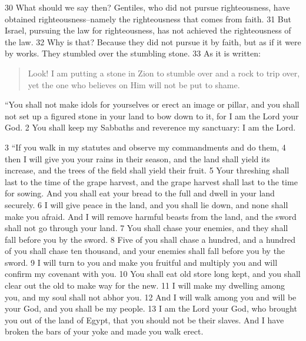 \begin{bible}

30 What should we say then? Gentiles, who did not pursue righteousness, have obtained righteousness--namely the righteousness that comes from faith. 31 But Israel, pursuing the law for righteousness, has not achieved the righteousness of the law. 32 Why is that? Because they did not pursue it by faith, but as if it were by works. They stumbled over the stumbling stone. 33 As it is written:
\begin{quote}
Look! I am putting a stone in Zion to stumble over
and a rock to trip over,
yet the one who believes on Him will not be put to shame.
\end{quote}


``You shall not make idols for yourselves or erect an image or pillar, and you shall not set up a figured stone in your land to bow down to it, for I am the Lord your God. 2 You shall keep my Sabbaths and reverence my sanctuary: I am the Lord.

3 ``If you walk in my statutes and observe my commandments and do them, 4 then I will give you your rains in their season, and the land shall yield its increase, and the trees of the field shall yield their fruit. 5 Your threshing shall last to the time of the grape harvest, and the grape harvest shall last to the time for sowing. And you shall eat your bread to the full and dwell in your land securely. 6 I will give peace in the land, and you shall lie down, and none shall make you afraid. And I will remove harmful beasts from the land, and the sword shall not go through your land. 7 You shall chase your enemies, and they shall fall before you by the sword. 8 Five of you shall chase a hundred, and a hundred of you shall chase ten thousand, and your enemies shall fall before you by the sword. 9 I will turn to you and make you fruitful and multiply you and will confirm my covenant with you. 10 You shall eat old store long kept, and you shall clear out the old to make way for the new. 11 I will make my dwelling among you, and my soul shall not abhor you. 12 And I will walk among you and will be your God, and you shall be my people. 13 I am the Lord your God, who brought you out of the land of Egypt, that you should not be their slaves. And I have broken the bars of your yoke and made you walk erect.


\end{bible}
